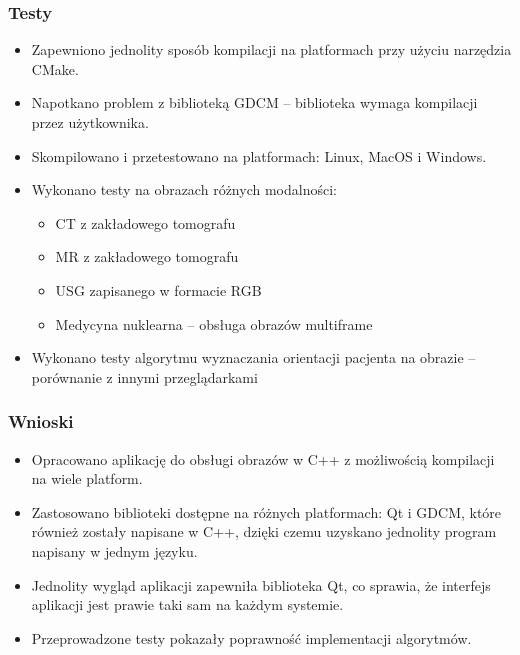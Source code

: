 \documentclass[aspectratio=169]{beamer}
\begin{document}
\begin{frame}
    \frametitle{Testy}
    \begin{itemize}
        \item Zapewniono jednolity sposób kompilacji na platformach przy użyciu narzędzia CMake.
        \item Napotkano problem z biblioteką GDCM -- biblioteka wymaga kompilacji przez użytkownika.
        \item Skompilowano i przetestowano na platformach: Linux, MacOS i Windows.
        \item Wykonano testy na obrazach różnych modalności:
        \begin{itemize}
            \item CT z zakładowego tomografu
            \item MR z zakładowego tomografu
            \item USG zapisanego w formacie RGB
            \item Medycyna nuklearna -- obsługa obrazów multiframe
        \end{itemize}
        \item Wykonano testy algorytmu wyznaczania orientacji pacjenta na obrazie -- porównanie z innymi przeglądarkami
    \end{itemize}

\end{frame}

\begin{frame}
    \frametitle{Wnioski}
    \begin{itemize}
        \item Opracowano aplikację do obsługi obrazów \DICOM w C++ z możliwością kompilacji na wiele platform.
        \item Zastosowano biblioteki dostępne na różnych platformach: Qt i GDCM, które również zostały napisane w C++, dzięki czemu uzyskano jednolity program napisany w jednym języku.
        \item Jednolity wygląd aplikacji zapewniła biblioteka Qt, co sprawia, że interfejs aplikacji jest prawie taki sam na każdym systemie.
        \item Przeprowadzone testy pokazały poprawność implementacji algorytmów.
    \end{itemize}

\end{frame}
\end{document}
